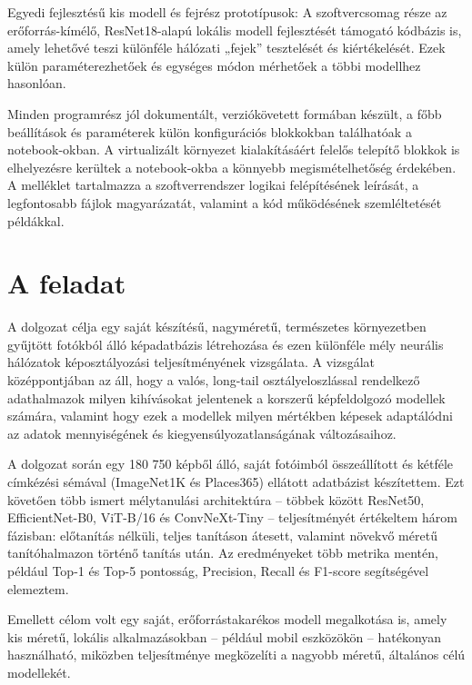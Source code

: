                 Egyedi fejlesztésű kis modell és fejrész prototípusok: A szoftvercsomag része az erőforrás-kímélő, ResNet18-alapú lokális modell fejlesztését támogató kódbázis is, amely lehetővé teszi különféle hálózati „fejek” tesztelését és kiértékelését. Ezek külön paraméterezhetőek és egységes módon mérhetőek a többi modellhez hasonlóan.

            Minden programrész jól dokumentált, verziókövetett formában készült, a főbb beállítások és paraméterek külön konfigurációs blokkokban találhatóak a notebook-okban. A virtualizált környezet kialakításáért felelős telepítő blokkok is elhelyezésre kerültek a notebook-okba a könnyebb megismételhetőség érdekében. A melléklet tartalmazza a szoftverrendszer logikai felépítésének leírását, a legfontosabb fájlok magyarázatát, valamint a kód működésének szemléltetését példákkal.
            \cleardoublepage

    \section{A feladat}
        A dolgozat célja egy saját készítésű, nagyméretű, természetes környezetben gyűjtött fotókból álló képadatbázis létrehozása és ezen különféle mély neurális hálózatok képosztályozási teljesítményének vizsgálata. A vizsgálat középpontjában az áll, hogy a valós, long-tail osztályeloszlással rendelkező adathalmazok milyen kihívásokat jelentenek a korszerű képfeldolgozó modellek számára, valamint hogy ezek a modellek milyen mértékben képesek adaptálódni az adatok mennyiségének és kiegyensúlyozatlanságának változásaihoz.

        A dolgozat során egy 180 750 képből álló, saját fotóimból összeállított és kétféle címkézési sémával (ImageNet1K és Places365) ellátott adatbázist készítettem. Ezt követően több ismert mélytanulási architektúra – többek között ResNet50, EfficientNet-B0, ViT-B/16 és ConvNeXt-Tiny – teljesítményét értékeltem három fázisban: előtanítás nélküli, teljes tanításon átesett, valamint növekvő méretű tanítóhalmazon történő tanítás után. Az eredményeket több metrika mentén, például Top-1 és Top-5 pontosság, Precision, Recall és F1-score segítségével elemeztem.
        
        Emellett célom volt egy saját, erőforrástakarékos modell megalkotása is, amely kis méretű, lokális alkalmazásokban – például mobil eszközökön – hatékonyan használható, miközben teljesítménye megközelíti a nagyobb méretű, általános célú modellekét.

